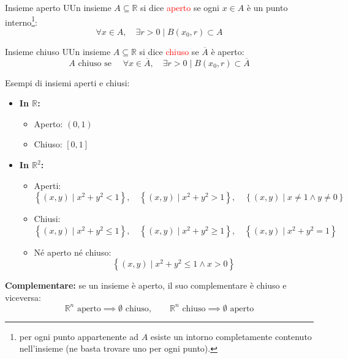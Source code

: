 \documentclass{article}  %
\begin{document}
\begin{definition}{Insieme aperto}
	UUn insieme $A \subseteq \mathbb{R}$ si dice \textcolor{red}{aperto} se ogni $x \in A$ è un punto interno\footnote{per ogni punto appartenente ad $A$ esiste un intorno completamente
		contenuto nell'insieme (ne basta trovare uno per ogni punto).}:
	\[
		\forall{x} \in A, \quad \exists r>0 \mid B(x_0, r) \subset A
	\]
\end{definition}

\begin{definition}{Insieme chiuso}
	UUn insieme $A \subseteq \mathbb{R}$ si dice \textcolor{red}{chiuso} se $\overline{A}$ è aperto:
	\[
		A \text{ chiuso se } \quad \forall{x} \in \overline{A}, \quad \exists r>0 \mid B(x_0, r) \subset \overline{A}
	\]
\end{definition}

Esempi di insiemi aperti e chiusi:

\begin{itemize}
	\item \textbf{In $\mathbb{R}$:}
	      \begin{itemize}
		      \item Aperto: $(0,1)$
		      \item Chiuso: $[0,1]$
	      \end{itemize}

	\item \textbf{In $\mathbb{R}^2$:}
	      \begin{itemize}
		      \item Aperti:
		            \[\left\{(x,y) \mid x^2+y^2 < 1 \right\}, \quad
			            \left\{(x,y) \mid x^2+y^2 > 1 \right\}, \quad
			            \left\{(x,y) \mid x \neq 1 \land y \neq 0 \right\}\]
		      \item Chiusi:
		            \[\left\{(x,y) \mid x^2+y^2 \leq 1 \right\}, \quad
			            \left\{(x,y) \mid x^2+y^2 \geq 1 \right\}, \quad
			            \left\{(x,y) \mid x^2+y^2 = 1 \right\}\]
		      \item Né aperto né chiuso:
		            \[\left\{(x,y) \mid x^2+y^2 \leq 1 \land x > 0 \right\}\]
	      \end{itemize}
\end{itemize}

\textbf{Complementare:} se un insieme è aperto, il suo complementare è chiuso e viceversa:
\[\mathbb{R}^n \text{ aperto} \implies \emptyset \text{ chiuso}, \qquad \mathbb{R}^n \text{ chiuso} \implies \emptyset \text{ aperto}\]
\end{document}

